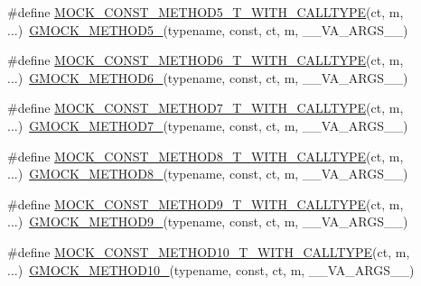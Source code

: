\begin{DoxyCompactItemize}
\item 
\#define \hyperlink{gmock-generated-function-mockers_8h_ae1e95e9eb000b737025cb74da20398ac}{M\+O\+C\+K\+\_\+\+C\+O\+N\+S\+T\+\_\+\+M\+E\+T\+H\+O\+D5\+\_\+\+T\+\_\+\+W\+I\+T\+H\+\_\+\+C\+A\+L\+L\+T\+Y\+PE}(ct,  m, ...)~\hyperlink{gmock-generated-function-mockers_8h_a9e3ecd392499ab19a4a6d3adcabf56f6}{G\+M\+O\+C\+K\+\_\+\+M\+E\+T\+H\+O\+D5\+\_\+}(typename, const, ct, m, \+\_\+\+\_\+\+V\+A\+\_\+\+A\+R\+G\+S\+\_\+\+\_\+)
\item 
\#define \hyperlink{gmock-generated-function-mockers_8h_a3acffd86eecfbcfe829231930406610b}{M\+O\+C\+K\+\_\+\+C\+O\+N\+S\+T\+\_\+\+M\+E\+T\+H\+O\+D6\+\_\+\+T\+\_\+\+W\+I\+T\+H\+\_\+\+C\+A\+L\+L\+T\+Y\+PE}(ct,  m, ...)~\hyperlink{gmock-generated-function-mockers_8h_ad0ca7f6973a076d0af4c953f8ed91842}{G\+M\+O\+C\+K\+\_\+\+M\+E\+T\+H\+O\+D6\+\_\+}(typename, const, ct, m, \+\_\+\+\_\+\+V\+A\+\_\+\+A\+R\+G\+S\+\_\+\+\_\+)
\item 
\#define \hyperlink{gmock-generated-function-mockers_8h_ac041233126a7740a136fc7a9737613dd}{M\+O\+C\+K\+\_\+\+C\+O\+N\+S\+T\+\_\+\+M\+E\+T\+H\+O\+D7\+\_\+\+T\+\_\+\+W\+I\+T\+H\+\_\+\+C\+A\+L\+L\+T\+Y\+PE}(ct,  m, ...)~\hyperlink{gmock-generated-function-mockers_8h_ab98a8399ba62b53b375c2807f4d39d2f}{G\+M\+O\+C\+K\+\_\+\+M\+E\+T\+H\+O\+D7\+\_\+}(typename, const, ct, m, \+\_\+\+\_\+\+V\+A\+\_\+\+A\+R\+G\+S\+\_\+\+\_\+)
\item 
\#define \hyperlink{gmock-generated-function-mockers_8h_aa4ed75d9f9d23eb0a00543d3ac1ed093}{M\+O\+C\+K\+\_\+\+C\+O\+N\+S\+T\+\_\+\+M\+E\+T\+H\+O\+D8\+\_\+\+T\+\_\+\+W\+I\+T\+H\+\_\+\+C\+A\+L\+L\+T\+Y\+PE}(ct,  m, ...)~\hyperlink{gmock-generated-function-mockers_8h_aa84a36427c44505207b7cad5dec7ad67}{G\+M\+O\+C\+K\+\_\+\+M\+E\+T\+H\+O\+D8\+\_\+}(typename, const, ct, m, \+\_\+\+\_\+\+V\+A\+\_\+\+A\+R\+G\+S\+\_\+\+\_\+)
\item 
\#define \hyperlink{gmock-generated-function-mockers_8h_afb8878388e0875e109d1fd6902471780}{M\+O\+C\+K\+\_\+\+C\+O\+N\+S\+T\+\_\+\+M\+E\+T\+H\+O\+D9\+\_\+\+T\+\_\+\+W\+I\+T\+H\+\_\+\+C\+A\+L\+L\+T\+Y\+PE}(ct,  m, ...)~\hyperlink{gmock-generated-function-mockers_8h_aa820171a19cc587c247dbe05cbffc55f}{G\+M\+O\+C\+K\+\_\+\+M\+E\+T\+H\+O\+D9\+\_\+}(typename, const, ct, m, \+\_\+\+\_\+\+V\+A\+\_\+\+A\+R\+G\+S\+\_\+\+\_\+)
\item 
\#define \hyperlink{gmock-generated-function-mockers_8h_af697bae09aedcdfb3d6897081efe7541}{M\+O\+C\+K\+\_\+\+C\+O\+N\+S\+T\+\_\+\+M\+E\+T\+H\+O\+D10\+\_\+\+T\+\_\+\+W\+I\+T\+H\+\_\+\+C\+A\+L\+L\+T\+Y\+PE}(ct,  m, ...)~\hyperlink{gmock-generated-function-mockers_8h_a81a48223a8771de36ef92ac6d56f6e81}{G\+M\+O\+C\+K\+\_\+\+M\+E\+T\+H\+O\+D10\+\_\+}(typename, const, ct, m, \+\_\+\+\_\+\+V\+A\+\_\+\+A\+R\+G\+S\+\_\+\+\_\+)
\end{DoxyCompactItemize}


